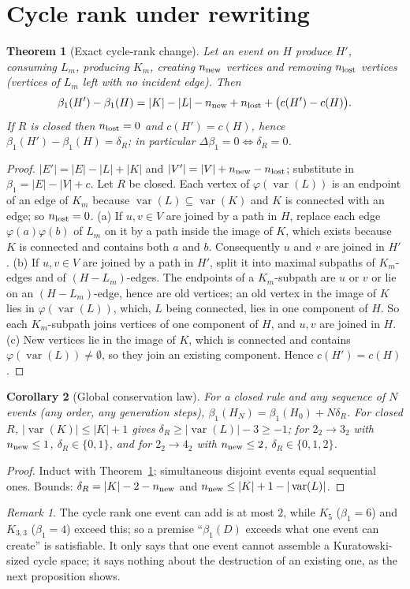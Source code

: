 \documentclass[10pt]{article}
\theoremstyle{definition}
\theoremstyle{plain}
\newtheorem{theorem}{Theorem}
\newtheorem{corollary}[theorem]{Corollary}
\theoremstyle{remark}
\newtheorem{remark}{Remark}
\newcommand{\Betti}{\beta_1}
\DeclareMathOperator{\var}{var}
\begin{document}
\section{Cycle rank under rewriting}
\begin{theorem}[Exact cycle-rank change]\label{thm:euler}
Let an event on $H$ produce $H'$, consuming $L_m$, producing $K_m$, creating $n_{\rm new}$ vertices and removing $n_{\rm lost}$ vertices (vertices of $L_m$ left with no incident edge). Then
\[
\Betti(H')-\Betti(H)=|K|-|L|-n_{\rm new}+n_{\rm lost}+\bigl(c(H')-c(H)\bigr).
\]
If $R$ is closed then $n_{\rm lost}=0$ and $c(H')=c(H)$, hence $\Betti(H')-\Betti(H)=\delta_R$; in particular $\Delta\Betti=0\iff\delta_R=0$.
\end{theorem}
\begin{proof}
$|E'|=|E|-|L|+|K|$ and $|V'|=|V|+n_{\rm new}-n_{\rm lost}$; substitute in $\Betti=|E|-|V|+c$. Let $R$ be closed. Each vertex of $\varphi(\var(L))$ is an endpoint of an edge of $K_m$ because $\var(L)\subseteq\var(K)$ and $K$ is connected with an edge; so $n_{\rm lost}=0$.
(a) If $u,v\in V$ are joined by a path in $H$, replace each edge $\varphi(a)\varphi(b)$ of $L_m$ on it by a path inside the image of $K$, which exists because $K$ is connected and contains both $a$ and $b$. Consequently $u$ and $v$ are joined in $H'$.
(b) If $u,v\in V$ are joined by a path in $H'$, split it into maximal subpaths of $K_m$-edges and of $(H-L_m)$-edges. The endpoints of a $K_m$-subpath are $u$ or $v$ or lie on an $(H-L_m)$-edge, hence are old vertices; an old vertex in the image of $K$ lies in $\varphi(\var(L))$, which, $L$ being connected, lies in one component of $H$. So each $K_m$-subpath joins vertices of one component of $H$, and $u,v$ are joined in $H$.
(c) New vertices lie in the image of $K$, which is connected and contains $\varphi(\var(L))\neq\emptyset$, so they join an existing component. Hence $c(H')=c(H)$.
\end{proof}

\begin{corollary}[Global conservation law]\label{cor:global}
For a closed rule and any sequence of $N$ events (any order, any generation steps), $\Betti(H_N)=\Betti(H_0)+N\delta_R$. For closed $R$, $|\var(K)|\le|K|+1$ gives $\delta_R\ge|\var(L)|-3\ge-1$; for $2_2\to3_2$ with $n_{\rm new}\le1$, $\delta_R\in\{0,1\}$, and for $2_2\to4_2$ with $n_{\rm new}\le2$, $\delta_R\in\{0,1,2\}$.
\end{corollary}
\begin{proof}
Induct with Theorem~\ref{thm:euler}; simultaneous disjoint events equal sequential ones. Bounds: $\delta_R=|K|-2-n_{\rm new}$ and $n_{\rm new}\le|K|+1-|\var(L)|$.
\end{proof}
\begin{remark}
The cycle rank one event can add is at most $2$, while $K_5$ ($\Betti=6$) and $K_{3,3}$ ($\Betti=4$) exceed this; so a premise ``$\Betti(D)$ exceeds what one event can create'' is satisfiable. It only says that one event cannot assemble a Kuratowski-sized cycle space; it says nothing about the destruction of an existing one, as the next proposition shows.
\end{remark}
\end{document}
